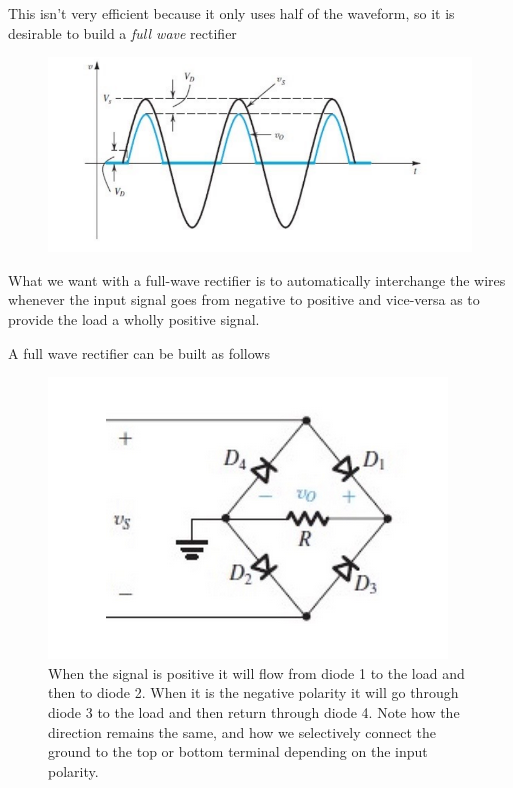 \documentclass[../notes.tex]{subfiles}
\begin{document}
This isn't very efficient because it only uses half of the waveform, so it is desirable to build a \textit{full wave} rectifier

\begin{figure}[H]
	\centering
	\includegraphics[width=0.8\linewidth]{img/image_2022-09-23-12-41-30.png}
\end{figure}


What we want with a full-wave rectifier is to automatically interchange the wires whenever the input signal goes from negative to positive and vice-versa as to provide the load a wholly positive signal.



A full wave rectifier can be built as follows

\begin{figure}[H]
	\centering
	\includegraphics[width=0.8\linewidth]{img/image_2022-09-23-12-48-48.png}
	\caption{When the signal is positive it will flow from diode 1 to the load and then to diode 2. When it is the negative polarity it will go through diode 3 to the load and then return through diode 4. Note how the direction remains the same, and how we selectively connect the ground to the top or bottom terminal depending on the input polarity.}
\end{figure}
\end{document}
